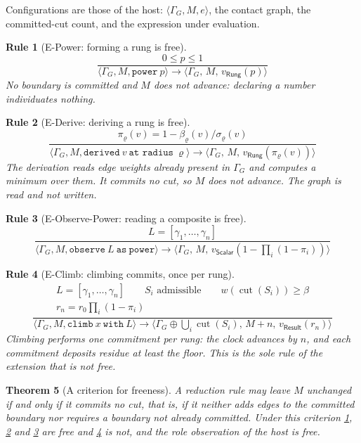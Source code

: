 \documentclass[11pt,twocolumn,a4paper]{article}
\theoremstyle{plain}
\newtheorem{theorem}{Theorem}[section]
\newtheorem{rulename}[theorem]{Rule}
\theoremstyle{definition}
\theoremstyle{remark}
\newcommand{\Gph}{\Gamma}
\newcommand{\cut}{\operatorname{cut}}
\newcommand{\wt}{w}
\newcommand{\flo}{\beta}
\newcommand{\sepc}{\sigma}
\newcommand{\pow}{\pi}
\newcommand{\gap}{r}
\newcommand{\Lad}{L}
\newcommand{\Rung}{\gamma}
\newcommand{\rad}{\varrho}
\newcommand{\shk}[1]{\texttt{#1}}
\begin{document}
Configurations are those of the host: $\langle\Gph_G,M,e\rangle$, the contact
graph, the committed-cut count, and the expression under evaluation.

\begin{rulename}[E-Power: forming a rung is free]
\label{rule:e-power}
\[
\frac{0\le p\le 1}
     {\langle\Gph_G,M,\shk{power}\ p\rangle \to
      \langle\Gph_G,\,M,\,v_{\mathsf{Rung}}(p)\rangle}
\]
No boundary is committed and $M$ does not advance: declaring a number
individuates nothing.
\end{rulename}

\begin{rulename}[E-Derive: deriving a rung is free]
\label{rule:e-derive}
\[
\frac{\pow_\rad(v)=1-\flo_\rad(v)/\sepc_\rad(v)}
     {\langle\Gph_G,M,\shk{derived}\ v\ \shk{at radius}\ \rad\rangle \to
      \langle\Gph_G,\,M,\,v_{\mathsf{Rung}}(\pow_\rad(v))\rangle}
\]
The derivation reads edge weights already present in $\Gph_G$ and computes a
minimum over them. It commits no cut, so $M$ does not advance. The graph is
read and not written.
\end{rulename}

\begin{rulename}[E-Observe-Power: reading a composite is free]
\label{rule:e-obspower}
\[
\frac{\Lad=[\Rung_1,\dots,\Rung_n]}
     {\langle\Gph_G,M,\shk{observe}\ \Lad\ \shk{as}\ \shk{power}\rangle \to
      \langle\Gph_G,\,M,\,v_{\mathsf{Scalar}}
        (1-\textstyle\prod_i(1-\pow_i))\rangle}
\]
\end{rulename}

\begin{rulename}[E-Climb: climbing commits, once per rung]
\label{rule:e-climb}
\[
\frac{\begin{array}{c}
 \Lad=[\Rung_1,\dots,\Rung_n] \qquad
 S_i \text{ admissible} \qquad \wt(\cut(S_i))\ge\flo\\
 \gap_n=\gap_0\prod_i(1-\pow_i)
\end{array}}
     {\langle\Gph_G,M,\shk{climb}\ x\ \shk{with}\ \Lad\rangle \to
      \langle\Gph_G\oplus\textstyle\bigcup_i\cut(S_i),\,M+n,\,
       v_{\mathsf{Result}}(\gap_n)\rangle}
\]
Climbing performs one commitment per rung: the clock advances by $n$, and each
commitment deposits residue at least the floor. This is the sole rule of the
extension that is not free.
\end{rulename}

\begin{theorem}[A criterion for freeness]
\label{thm:free}
A reduction rule may leave $M$ unchanged if and only if it commits no cut,
that is, if it neither adds edges to the committed boundary nor requires a
boundary not already committed. Under this criterion \cref{rule:e-power},
\cref{rule:e-derive} and \cref{rule:e-obspower} are free and
\cref{rule:e-climb} is not, and the role observation of the host is free.
\end{theorem}
\end{document}
